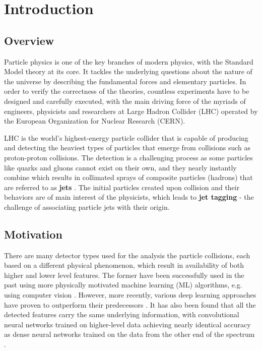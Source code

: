 \chapter{Introduction}

\section{Overview}
Particle physics is one of the key branches of modern physics, with the Standard Model theory at its core. It tackles the underlying questions about the nature of the universe by describing the fundamental forces and elementary particles. In order to verify the correctness of the theories, countless experiments have to be designed and carefully executed, with the main driving force of the myriads of engineers, physicists and researchers at Large Hadron Collider (LHC) operated by the European Organization for Nuclear Research (CERN).

LHC is the world's highest-energy particle collider that is capable of producing and detecting the heaviest types of particles that emerge from collisions such as proton-proton collisions. The detection is a challenging process as some particles like quarks and gluons cannot exist on their own, and they nearly instantly combine which results in collimated sprays of composite particles (hadrons) that are referred to as \textbf{jets} \cite{4-cernjets}. The initial particles created upon collision and their behaviors are of main interest of the physicists, which leads to \textbf{jet tagging} - the challenge of associating particle jets with their origin.


\section{Motivation}\label{motivation}
There are many detector types used for the analysis the particle collisions, each based on a different physical phenomenon, which result in availability of both higher and lower level features. The former have been successfully used in the past using more physically motivated machine learning (ML) algorithms, e.g. using computer vision \cite{5-cogan2015jet-images:}. However, more recently, various deep learning approaches have proven to outperform their predecessors \cite{6-de2016jet-images}. It has also been found that all the detected features carry the same underlying information, with convolutional neural networks trained on higher-level data achieving nearly identical accuracy as dense neural networks trained on the data from the other end of the spectrum \cite{7-moore2019reports}.

